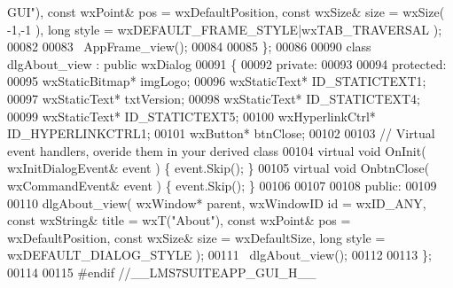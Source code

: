 \begin{DoxyCode}
{       GUI"}), \textcolor{keyword}{const} wxPoint& pos = wxDefaultPosition, \textcolor{keyword}{const} wxSize& size = wxSize( -1,-1 ), \textcolor{keywordtype}{long} style = 
      wxDEFAULT\_FRAME\_STYLE|wxTAB\_TRAVERSAL );
00082         
00083         ~AppFrame_view();
00084     
00085 \};
00086 
00090 \textcolor{keyword}{class }dlgAbout_view : \textcolor{keyword}{public} wxDialog 
00091 \{
00092     \textcolor{keyword}{private}:
00093     
00094     \textcolor{keyword}{protected}:
00095         wxStaticBitmap* imgLogo;
00096         wxStaticText* ID_STATICTEXT1;
00097         wxStaticText* txtVersion;
00098         wxStaticText* ID_STATICTEXT4;
00099         wxStaticText* ID_STATICTEXT5;
00100         wxHyperlinkCtrl* ID_HYPERLINKCTRL1;
00101         wxButton* btnClose;
00102         
00103         \textcolor{comment}{// Virtual event handlers, overide them in your derived class}
00104         \textcolor{keyword}{virtual} \textcolor{keywordtype}{void} OnInit( wxInitDialogEvent& event ) \{ \textcolor{keyword}{event}.Skip(); \}
00105         \textcolor{keyword}{virtual} \textcolor{keywordtype}{void} OnbtnClose( wxCommandEvent& event ) \{ \textcolor{keyword}{event}.Skip(); \}
00106         
00107     
00108     \textcolor{keyword}{public}:
00109         
00110         dlgAbout_view( wxWindow* parent, wxWindowID \textcolor{keywordtype}{id} = wxID\_ANY, \textcolor{keyword}{const} wxString& title = wxT(\textcolor{stringliteral}{"About"}), \textcolor{keyword}{
      const} wxPoint& pos = wxDefaultPosition, \textcolor{keyword}{const} wxSize& size = wxDefaultSize, \textcolor{keywordtype}{long} style = 
      wxDEFAULT\_DIALOG\_STYLE ); 
00111         ~dlgAbout_view();
00112     
00113 \};
00114 
00115 \textcolor{preprocessor}{#endif //\_\_LMS7SUITEAPP\_GUI\_H\_\_}
\end{DoxyCode}
